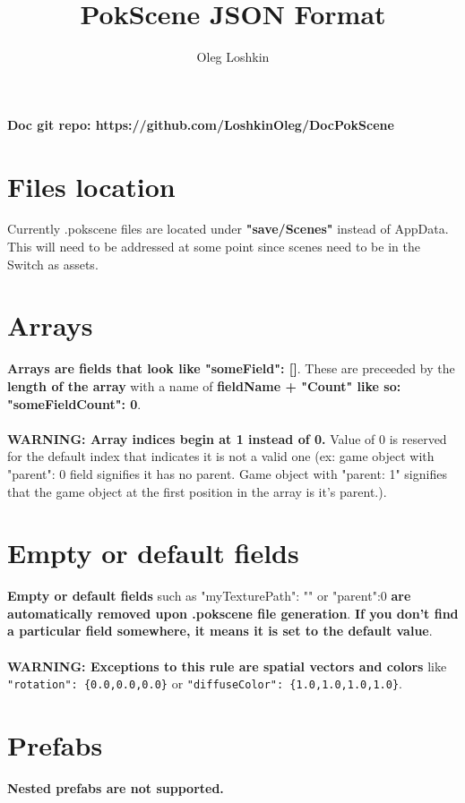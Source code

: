\documentclass[10pt,a4paper]{article}
\author{Oleg Loshkin}
\title{PokScene JSON Format}
\begin{document}
\maketitle
\noindent \textbf{Doc git repo: https://github.com/LoshkinOleg/DocPokScene}

\section{Files location}
Currently .pokscene files are located under \textbf{"save/Scenes"} instead of AppData. This will need to be addressed at some point since scenes need to be in the Switch as assets.

\section{Arrays}
\textbf{Arrays are fields that look like "someField": []}. These are preceeded by the \textbf{length of the array} with a name of \textbf{fieldName + "Count" like so: "someFieldCount": 0}.\\\\
\textbf{WARNING: Array indices begin at 1 instead of 0.} Value of 0 is reserved for the default index that indicates it is not a valid one (ex: game object with "parent": 0 field signifies it has no parent. Game object with "parent: 1" signifies that the game object at the first position in the array is it's parent.).

\section{Empty or default fields}
\textbf{Empty or default fields} such as "myTexturePath": "" or "parent":0 \textbf{are automatically removed upon .pokscene file generation}. \textbf{If you don't find a particular field somewhere, it means it is set to the default value}.\\\\
\textbf{WARNING: Exceptions to this rule are spatial vectors and colors} like \texttt{"rotation": \{0.0,0.0,0.0\}} or \texttt{"diffuseColor": \{1.0,1.0,1.0,1.0\}}.

\section{Prefabs}
\textbf{Nested prefabs are not supported.}

\newpage
\end{document}
